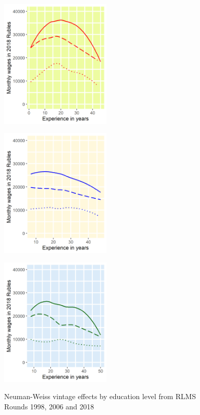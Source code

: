 \documentclass[12pt,a4paper]{article}
\numberwithin{equation}{section}
\begin{document}
	\begin{figure}[H]
		\begin{minipage}[b]{.3\linewidth}
			\centering
			\hspace*{-0.7in}
			\includegraphics[width=150pt]{dp01_he.png}
			\label{fig:2.1a}
		\end{minipage}
		\hfill
		\begin{minipage}[b]{.3\linewidth}
			\centering
			\hspace*{-0.7in}
			\includegraphics[width=150pt]{dp01_ve.png}
			\label{fig:2.1b}
		\end{minipage}
		\hfill
		\begin{minipage}[b]{.3\linewidth}
			\centering
			\hspace*{-0.7in}
			\includegraphics[width=150pt]{dp01_se.png}
			\label{fig:2.1c}
		\end{minipage}
		\caption{Neuman-Weiss vintage effects by education level from RLMS Rounds 1998, 2006 and 2018}\label{fig:2.1}
	\end{figure}
	
\end{document}
